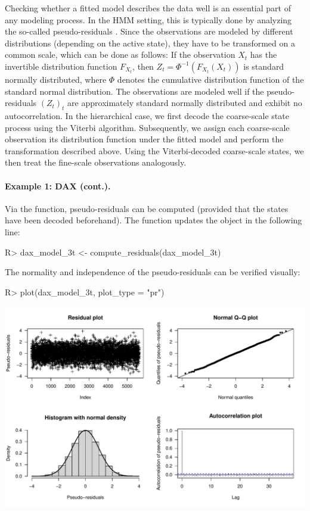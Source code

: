 \documentclass[article,shortnames]{jss}
\newcommand{\fct}[1]{\code{#1()}}
\begin{document}
Checking whether a fitted model describes the data well is an essential part of any modeling process. In the HMM setting, this is typically done by analyzing the so-called pseudo-residuals \citep{zuc16}. Since the observations are modeled by different distributions (depending on the active state), they have to be transformed on a common scale, which can be done as follows: If the observation $X_t$ has the invertible distribution function $F_{X_t}$, then $Z_t=\Phi^{-1}(F_{X_t} (X_t))$ is standard normally distributed, where $\Phi$ denotes the cumulative distribution function of the standard normal distribution. The observations are modeled well if the pseudo-residuals $(Z_t)_t$ are approximately standard normally distributed and exhibit no autocorrelation. In the hierarchical case, we first decode the coarse-scale state process using the Viterbi algorithm. Subsequently, we assign each coarse-scale observation its distribution function under the fitted model and perform the transformation described above. Using the Viterbi-decoded coarse-scale states, we then treat the fine-scale observations analogously.

\paragraph{Example 1: DAX (cont.).}

Via the \fct{compute\_residuals} function, pseudo-residuals can be computed (provided that the states have been decoded beforehand). The function updates the  object in the following line:

%
\begin{Schunk}
\begin{Sinput}
R> dax_model_3t <- compute_residuals(dax_model_3t)
\end{Sinput}
\end{Schunk}
%

The normality and independence of the pseudo-residuals can be verified visually:

%
\begin{Schunk}
\begin{Sinput}
R> plot(dax_model_3t, plot_type = "pr")
\end{Sinput}
\end{Schunk}
\includegraphics{fhmm_oelschlaeger_adam_michels-dax-res}
%
\end{document}
